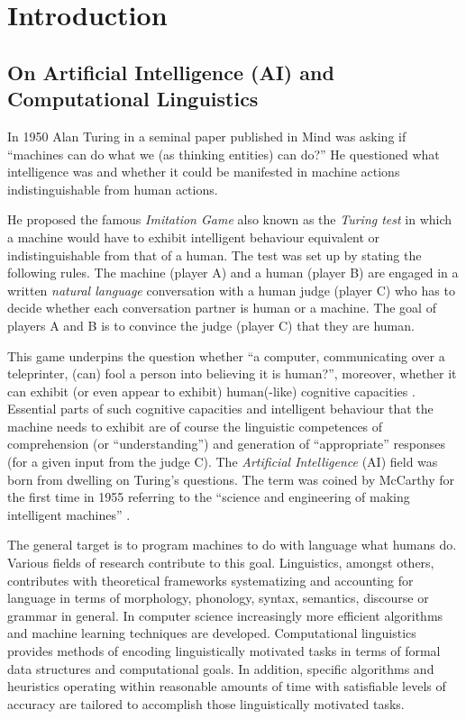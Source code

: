 \chapter{Introduction}
\label{ch:introduction}

\section{On Artificial Intelligence (AI) and Computational Linguistics}
In 1950 Alan Turing in a seminal paper \citep{Turing1950} published in Mind was asking if ``machines can do what we (as thinking entities) can do?'' He questioned what intelligence was and whether it could be manifested in machine actions indistinguishable from human actions. 

He proposed the famous \textit{Imitation Game} also known as the \textit{Turing test} in which a machine would have to exhibit intelligent behaviour equivalent or indistinguishable from that of a human. The test was set up by stating the following rules. The machine (player A) and a human (player B) are engaged in a written \textit{natural language} conversation with a human judge (player C) who has to decide whether each conversation partner is human or a machine. The goal of players A and B is to convince the judge (player C) that they are human. 

This game underpins the question whether ``a computer, communicating over a teleprinter, (can) fool a person into believing it is human?'', moreover, whether it can exhibit (or even appear to exhibit) human(-like) cognitive capacities \citep{Harnad1992}. Essential parts of such cognitive capacities and intelligent behaviour that the machine needs to exhibit are of course the linguistic competences of comprehension (or ``understanding'') and generation of ``appropriate'' responses (for a given input from the judge C). The \textit{Artificial Intelligence} (AI) field was born from dwelling on Turing's questions. The term was coined by McCarthy for the first time in 1955 referring to the ``science and engineering of making intelligent machines'' \citep{McCarthy1955}.

The general target is to program machines to do with language what humans do. Various fields of research contribute to this goal. Linguistics, amongst others, contributes with theoretical frameworks systematizing and accounting for language in terms of morphology, phonology, syntax, semantics, discourse or grammar in general. In computer science increasingly more efficient algorithms and machine learning techniques are developed. Computational linguistics provides methods of encoding linguistically motivated tasks in terms of formal data structures and computational goals. In addition, specific algorithms and heuristics operating within reasonable amounts of time with satisfiable levels of accuracy are tailored to accomplish those linguistically motivated tasks.

